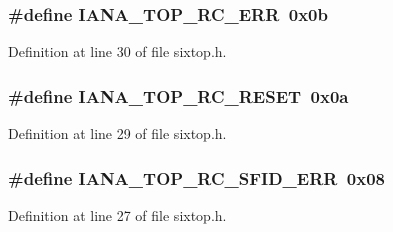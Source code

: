 \subsubsection[{\texorpdfstring{I\+A\+N\+A\+\_\+6\+T\+O\+P\+\_\+\+R\+C\+\_\+\+E\+RR}{IANA_6TOP_RC_ERR}}]{\setlength{\rightskip}{0pt plus 5cm}\#define I\+A\+N\+A\+\_\+T\+O\+P\+\_\+\+R\+C\+\_\+\+E\+RR~0x0b}\hypertarget{group__sixtop_ga75b866e3a1f1d116a0d61943779a811f}{}\label{group__sixtop_ga75b866e3a1f1d116a0d61943779a811f}


Definition at line 30 of file sixtop.\+h.

\subsubsection[{\texorpdfstring{I\+A\+N\+A\+\_\+6\+T\+O\+P\+\_\+\+R\+C\+\_\+\+R\+E\+S\+ET}{IANA_6TOP_RC_RESET}}]{\setlength{\rightskip}{0pt plus 5cm}\#define I\+A\+N\+A\+\_\+T\+O\+P\+\_\+\+R\+C\+\_\+\+R\+E\+S\+ET~0x0a}\hypertarget{group__sixtop_ga5f807240736ea7b4938e6b2087e3e024}{}\label{group__sixtop_ga5f807240736ea7b4938e6b2087e3e024}


Definition at line 29 of file sixtop.\+h.

\subsubsection[{\texorpdfstring{I\+A\+N\+A\+\_\+6\+T\+O\+P\+\_\+\+R\+C\+\_\+\+S\+F\+I\+D\+\_\+\+E\+RR}{IANA_6TOP_RC_SFID_ERR}}]{\setlength{\rightskip}{0pt plus 5cm}\#define I\+A\+N\+A\+\_\+T\+O\+P\+\_\+\+R\+C\+\_\+\+S\+F\+I\+D\+\_\+\+E\+RR~0x08}\hypertarget{group__sixtop_gabb11416715eb01fad87f5e28867c6bd9}{}\label{group__sixtop_gabb11416715eb01fad87f5e28867c6bd9}


Definition at line 27 of file sixtop.\+h.

